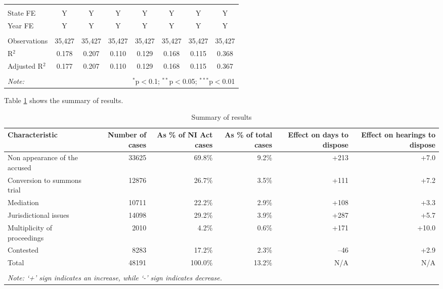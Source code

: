 {\begin{longtable}{lccccccc}
 \hline \\[-1.8ex]
 State FE & Y & Y & Y & Y & Y & Y & Y \\ 
 Year FE & Y & Y & Y & Y & Y & Y & Y \\ 
 \hline \\[-1.8ex] 
 Observations & 35,427 & 35,427 & 35,427 & 35,427 & 35,427 & 35,427 & 35,427 \\ 
 R$^{2}$ & 0.178 & 0.207 & 0.110 & 0.129 & 0.168 & 0.115 & 0.368 \\ 
 Adjusted R$^{2}$ & 0.177 & 0.207 & 0.110 & 0.129 & 0.168 & 0.115 & 0.367 \\ 
 \hline \\[-1.8ex] 
 \textit{Note:} & \multicolumn{7}{r}{$^{*}$p$<$0.1; $^{**}$p$<$0.05; $^{***}$p$<$0.01} \\ 
\end{longtable}}

Table \ref{tab:summary_results} shows the summary of results.

{\footnotesize \begin{longtable}{@{}p{2.5cm}rrrrr}
 \caption{Summary of results}\label{tab:summary_results}\\
 \toprule
 \textbf{Characteristic} & \multicolumn{1}{p{2cm}}{\textbf{Number of cases}} &
 \multicolumn{1}{p{2cm}}{\textbf{As \% of NI Act cases}}
 & \multicolumn{1}{p{2cm}}{\textbf{As \% of total cases}}
 & \multicolumn{1}{p{2cm}}{\textbf{Effect on days to dispose}} &
 \multicolumn{1}{p{2cm}}{\textbf{Effect on hearings to dispose}}
 \\
 \midrule
 Non appearance of the accused & 33625 & 69.8\% & 9.2\% & +213 & +7.0 \\ \midrule
 Conversion to summons trial & 12876 & 26.7\% & 3.5\% & +111 & +7.2 \\ \midrule
 Mediation & 10711 & 22.2\% & 2.9\% & +108 & +3.3 \\ \midrule
 Jurisdictional issues & 14098 & 29.2\% & 3.9\% & +287 & +5.7 \\ \midrule
 Multiplicity of proceedings & 2010 & 4.2\% & 0.6\% & +171 & +10.0 \\ \midrule
 Contested & 8283 & 17.2\% & 2.3\% & --46 & +2.9 \\ \midrule
 Total & 48191 & 100.0\% & 13.2\% & N/A & N/A \\
 \bottomrule
 \\
 \multicolumn{6}{l}{{\footnotesize \emph{Note: `+' sign
 indicates an increase, while `-' sign indicates decrease.}}}\\
\end{longtable}
}

